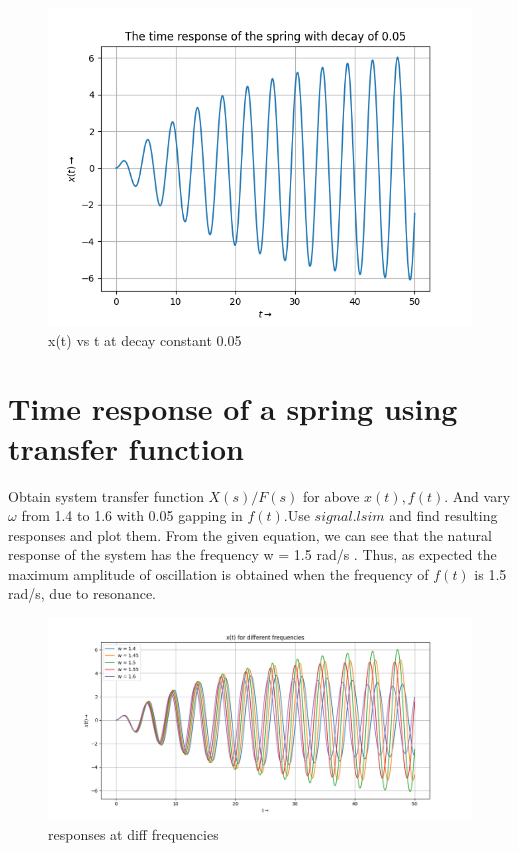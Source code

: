 \documentclass[11pt, a4paper]{article}
\begin{document}
\begin{figure}[!tbh]
  \centering
  \includegraphics[scale=0.5]{decay_constant=0.05.png}  
  \caption{x(t) vs t at decay constant 0.05} 
  \label{fig:fig2}
\end{figure} 
\pagebreak
\newpage
\section{Time response of a spring using transfer function}
Obtain system transfer function $X(s)/F(s)$ for above $x(t),f(t)$. And vary $\omega$ from 1.4 to 1.6 with 0.05 gapping in $f(t)$.Use $signal.lsim$ and find resulting responses and plot them.
From the given equation, we can see that the natural response of the system has the frequency w = 1.5 rad/s . Thus, as expected the maximum amplitude of oscillation is obtained when the frequency of $f(t)$ is 1.5 rad/s, due to resonance.
\begin{figure}[!tbh]
  \centering
  \includegraphics[scale=0.5]{diff_omega.png}
  \caption{responses at diff frequencies} 
  \label{fig:fig3}
\end{figure}
\end{document}
